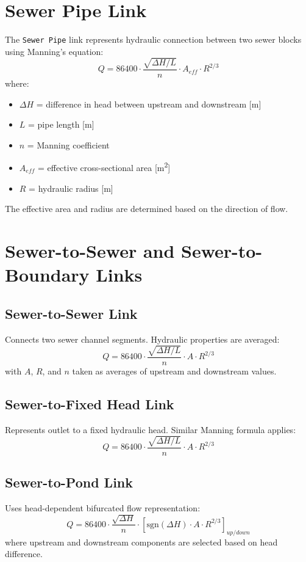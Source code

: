 \documentclass[12pt]{report}
\begin{document}
\FloatBarrier
\section{Sewer Pipe Link}

The \texttt{Sewer Pipe} link represents hydraulic connection between two sewer blocks using Manning’s equation:
\begin{equation}
Q = 86400 \cdot \frac{\sqrt{\Delta H / L}}{n} \cdot A_{eff} \cdot R^{2/3}
\end{equation}
where:
\begin{itemize}
\item $\Delta H$ = difference in head between upstream and downstream \textnormal{[m]}
\item $L$ = pipe length \textnormal{[m]}
\item $n$ = Manning coefficient
\item $A_{eff}$ = effective cross-sectional area \textnormal{[m\textsuperscript{2}]}
\item $R$ = hydraulic radius \textnormal{[m]}
\end{itemize}
The effective area and radius are determined based on the direction of flow.

\section{Sewer-to-Sewer and Sewer-to-Boundary Links}

\subsection{Sewer-to-Sewer Link}
Connects two sewer channel segments. Hydraulic properties are averaged:
\begin{equation}
Q = 86400 \cdot \frac{\sqrt{\Delta H / L}}{n} \cdot A \cdot R^{2/3}
\end{equation}
with $A$, $R$, and $n$ taken as averages of upstream and downstream values.

\subsection{Sewer-to-Fixed Head Link}
Represents outlet to a fixed hydraulic head. Similar Manning formula applies:
\begin{equation}
Q = 86400 \cdot \frac{\sqrt{\Delta H / L}}{n} \cdot A \cdot R^{2/3}
\end{equation}

\subsection{Sewer-to-Pond Link}
Uses head-dependent bifurcated flow representation:
\begin{equation}
Q = 86400 \cdot \frac{\sqrt{\Delta H}}{n} \cdot \left[ \text{sgn}(\Delta H) \cdot A \cdot R^{2/3} \right]_{up/down}
\end{equation}
where upstream and downstream components are selected based on head difference.
\end{document}
